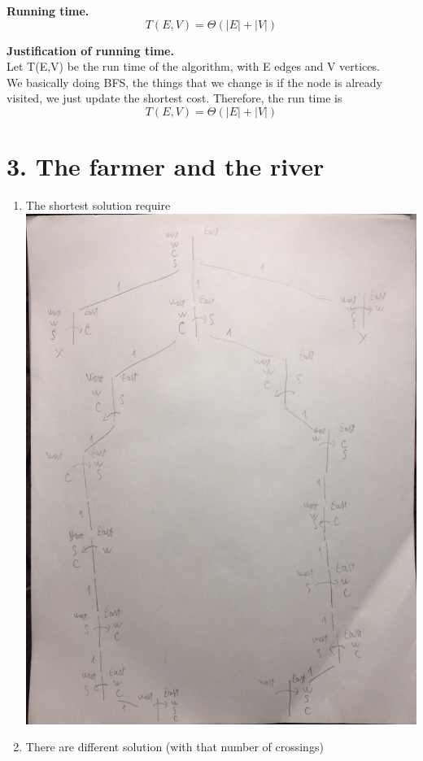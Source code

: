 \documentclass[11pt]{article}
\newenvironment{qparts}{\begin{enumerate}[{(}a{)}]}{\end{enumerate}}
\begin{document}
\noindent
\textbf{Running time.}
$$\boxed{T(E,V) = \Theta(|E| + |V|)}$$ 


\noindent
\textbf{Justification of running time.}\\
Let T(E,V) be the run time of the algorithm, with E edges and V vertices.\\
We basically doing BFS, the things that we change is if the node is already visited, we just update the shortest cost. Therefore, the run time is 
$$\boxed{T(E,V) = \Theta(|E| + |V|)}$$ 


\newpage
\section*{3. The farmer and the river}
\noindent
\begin{qparts}
\item
The shortest solution require \\
\includegraphics[scale=0.35]{problem3.jpg}
\item
There are  different solution (with that number of crossings)\\ 

\end{qparts}
\end{document}
